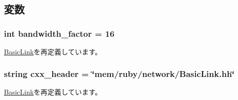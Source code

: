 \subsection{変数}
\hypertarget{classBasicLink_1_1BasicIntLink_affbbb1b5f39453ff2abf6f5ae9385606}{
\subsubsection[{bandwidth\_\-factor}]{\setlength{\rightskip}{0pt plus 5cm}int {\bf bandwidth\_\-factor} = 16}}
\label{classBasicLink_1_1BasicIntLink_affbbb1b5f39453ff2abf6f5ae9385606}


\hyperlink{classBasicLink_1_1BasicLink_ac591437927b62e1825866e5357208d37}{BasicLink}を再定義しています。\hypertarget{classBasicLink_1_1BasicIntLink_a17da7064bc5c518791f0c891eff05fda}{
\subsubsection[{cxx\_\-header}]{\setlength{\rightskip}{0pt plus 5cm}string {\bf cxx\_\-header} = \char`\"{}mem/ruby/network/BasicLink.hh\char`\"{}}}
\label{classBasicLink_1_1BasicIntLink_a17da7064bc5c518791f0c891eff05fda}


\hyperlink{classBasicLink_1_1BasicLink_a17da7064bc5c518791f0c891eff05fda}{BasicLink}を再定義しています。

